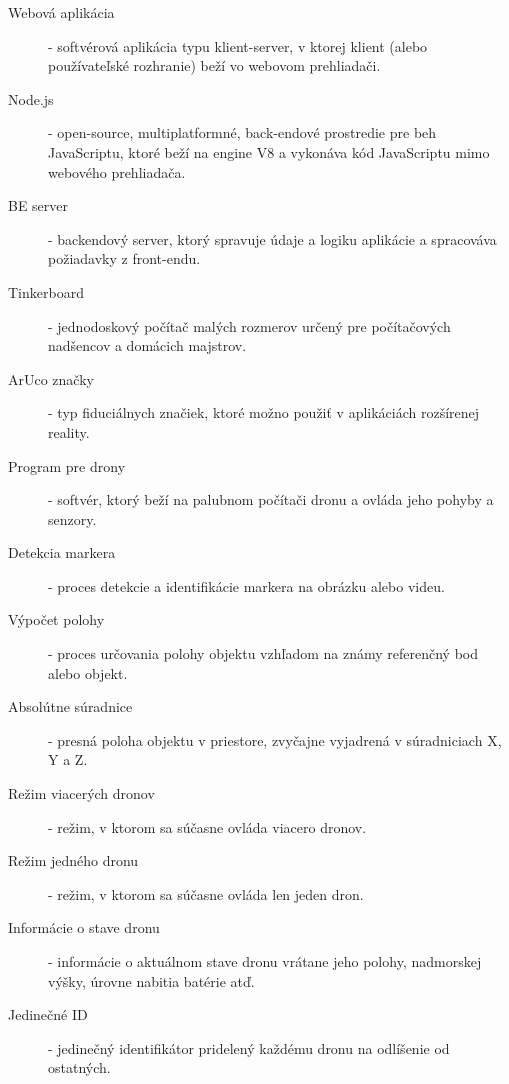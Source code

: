 \documentclass[]{tukediphc}
\begin{document}
\begin{description}
	\item[Webová aplikácia] - softvérová aplikácia typu klient-server, v ktorej klient (alebo používateľské rozhranie) beží vo webovom prehliadači.
	\item[Node.js] - open-source, multiplatformné, back-endové prostredie pre beh JavaScriptu, ktoré beží na engine V8 a vykonáva kód JavaScriptu mimo webového prehliadača.	
	\item[BE server] - backendový server, ktorý spravuje údaje a logiku aplikácie a spracováva požiadavky z front-endu.	
	\item[Tinkerboard] - jednodoskový počítač malých rozmerov určený pre počítačových nadšencov a domácich majstrov.	
	\item[ArUco značky] - typ fiduciálnych značiek, ktoré možno použiť v aplikáciách rozšírenej reality.	
	\item[Program pre drony] - softvér, ktorý beží na palubnom počítači dronu a ovláda jeho pohyby a senzory.
	\item[Detekcia markera] - proces detekcie a identifikácie markera na obrázku alebo videu.	
	\item[Výpočet polohy] - proces určovania polohy objektu vzhľadom na známy referenčný bod alebo objekt.	
	\item[Absolútne súradnice] - presná poloha objektu v priestore, zvyčajne vyjadrená v súradniciach X, Y a Z.	
	\item[Režim viacerých dronov] - režim, v ktorom sa súčasne ovláda viacero dronov.	
	\item[Režim jedného dronu] - režim, v ktorom sa súčasne ovláda len jeden dron.	
	\item[Informácie o stave dronu] - informácie o aktuálnom stave dronu vrátane jeho polohy, nadmorskej výšky, úrovne nabitia batérie atď.
	\item[Jedinečné ID] - jedinečný identifikátor pridelený každému dronu na odlíšenie od ostatných.
\end{description}

\kslovnikterminov
%

%

%

%

%   

%

%

%

%
 


% 
%

% 
% 
% 
%
\newpage
{}
\protect\label{page:posledna}
\end{document}
